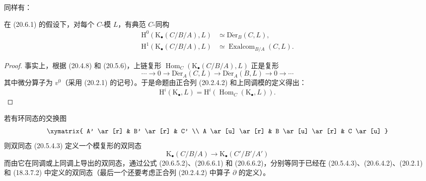 同样有：
\begin{proposition}[20.6.6]
\label{0.20.6.6-fr}
在 (20.6.1) 的假设下，对每个 $C$-模 $L$，有典范 $C$-同构
\begin{align}
\tag{20.6.6.1}
\label{0.20.6.6.1-fr}
  \mathrm{H}^0(\mathrm{K}_\bullet(C/B/A),L)&\simeq\operatorname{D\acute{e}r}_B(C,L),\\
\tag{20.6.6.2}
\label{0.20.6.6.2-fr}
  \mathrm{H}^1(\mathrm{K}_\bullet(C/B/A),L)&\simeq
  \operatorname{Exalcom}_{B/A}(C,L).
\end{align}
\end{proposition}

\begin{proof}
事实上，根据 (20.4.8) 和 (20.5.6)，上链复形
$\operatorname{Hom}_C(\mathrm{K}_\bullet(C/B/A),L)$ 正是复形
\[
  \cdots\longrightarrow0\longrightarrow\operatorname{D\acute{e}r}_A(C,L)
  \longrightarrow\operatorname{D\acute{e}r}_A(B,L)\longrightarrow0\longrightarrow\cdots
\]
其中微分算子为 $v^0$（采用 (20.2.1) 的记号）。于是命题由正合列
(20.2.4.2) 和上同调模的定义得出：
\begin{equation}
\tag{20.6.6.3}
\label{0.20.6.6.3-fr}
  \mathrm{H}^i(\mathrm{K}_\bullet,L)=
  \mathrm{H}^i(\operatorname{Hom}_C(\mathrm{K}_\bullet,L)).
\end{equation}
\end{proof}

若有环同态的交换图
\[
\xymatrix{
  A' \ar[r] & B' \ar[r] & C' \\
  A \ar[u] \ar[r] & B \ar[u] \ar[r] & C \ar[u]
}
\]
则双同态 (20.5.4.3) 定义一个模复形的双同态
\begin{equation}
\tag{20.6.6.4}
\label{0.20.6.6.4-fr}
  \mathrm{K}_\bullet(C/B/A)\longrightarrow
  \mathrm{K}_\bullet(C'/B'/A')
\end{equation}
而由它在同调或上同调上导出的双同态，通过公式 (20.6.5.2)、(20.6.6.1) 和
(20.6.6.2)，分别等同于已经在 (20.5.4.3)、(20.6.4.2)、(20.2.1) 和
(18.3.7.2) 中定义的双同态（最后一个还要考虑正合列 (20.2.4.2) 中算子
$\partial$ 的定义）。

